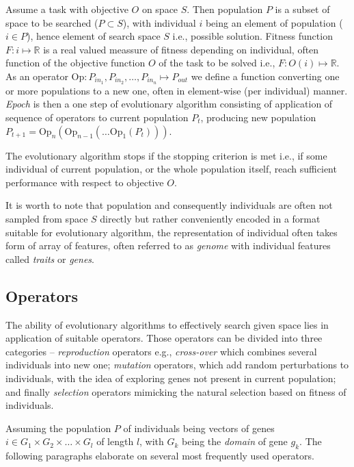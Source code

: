 Assume a task with objective $O$ on space $S$. Then population $P$ is a subset of space to be searched ($P \subset S$), with individual $i$ being an element of population ($i \in P$), hence element of search space $S$ i.e., possible solution. Fitness function $F: i \mapsto \mathbb{R}$ is a real valued meassure of fitness depending on individual, often function of the objective function $O$ of the task to be solved i.e., $F: O(i) \mapsto \mathbb{R}$. As an operator $\text{Op}: P_{in_1}, P_{in_2}, \dots, P_{in_n} \mapsto P_{out}$ we define a function converting one or more populations to a new one, often in element-wise (per individual) manner. \emph{Epoch} is then a one step of evolutionary algorithm consisting of application of sequence of operators to current population $P_t$, producing new population $P_{t+1} = \text{Op}_n(\text{Op}_{n-1}(\dots \text{Op}_1(P_t)))$.

The evolutionary algorithm stops if the stopping criterion is met i.e., if some individual of current population, or the whole population itself, reach sufficient performance with respect to objective $O$.

It is worth to note that population and consequently individuals are often not sampled from space $S$ directly but rather conveniently encoded in a format suitable for evolutionary algorithm, the representation of individual often takes form of array of features, often referred to as \emph{genome} with individual features called \emph{traits} or \emph{genes}.

\subsection{Operators}
The ability of evolutionary algorithms to effectively search given space lies in application of suitable operators. Those operators can be divided into three categories -- \emph{reproduction} operators e.g., \emph{cross-over} which combines several individuals into new one; \emph{mutation} operators, which add random perturbations to individuals, with the idea of exploring genes not present in current population; and finally \emph{selection} operators mimicking the natural selection based on fitness of individuals.

Assuming the population $P$ of individuals being vectors of genes $i \in G_1 \times G_2 \times \dots \times G_l$ of length $l$, with $G_k$ being the \emph{domain} of gene $g_k$. The following paragraphs elaborate on several most frequently used operators.

